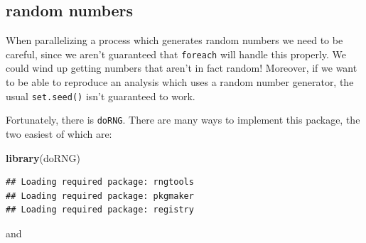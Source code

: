 \documentclass[]{article}
\newenvironment{Shaded}{\begin{snugshade}}{\end{snugshade}}
\newcommand{\KeywordTok}[1]{\textcolor[rgb]{0.13,0.29,0.53}{\textbf{{#1}}}}
\newcommand{\DataTypeTok}[1]{\textcolor[rgb]{0.13,0.29,0.53}{{#1}}}
\newcommand{\DecValTok}[1]{\textcolor[rgb]{0.00,0.00,0.81}{{#1}}}
\newcommand{\StringTok}[1]{\textcolor[rgb]{0.31,0.60,0.02}{{#1}}}
\newcommand{\NormalTok}[1]{{#1}}
\begin{document}
\subsection{random numbers}\label{random-numbers}

When parallelizing a process which generates random numbers we need to
be careful, since we aren't guaranteed that \texttt{foreach} will handle
this properly. We could wind up getting numbers that aren't in fact
random! Moreover, if we want to be able to reproduce an analysis which
uses a random number generator, the usual \texttt{set.seed()} isn't
guaranteed to work.

Fortunately, there is \texttt{doRNG}. There are many ways to implement
this package, the two easiest of which are:

\begin{Shaded}
\begin{Highlighting}[]
\KeywordTok{library}\NormalTok{(doRNG)}
\end{Highlighting}
\end{Shaded}

\begin{verbatim}
## Loading required package: rngtools
## Loading required package: pkgmaker
## Loading required package: registry
\end{verbatim}

\begin{Shaded}
\end{Shaded}

and

\begin{Shaded}
\end{Shaded}
\end{document}
